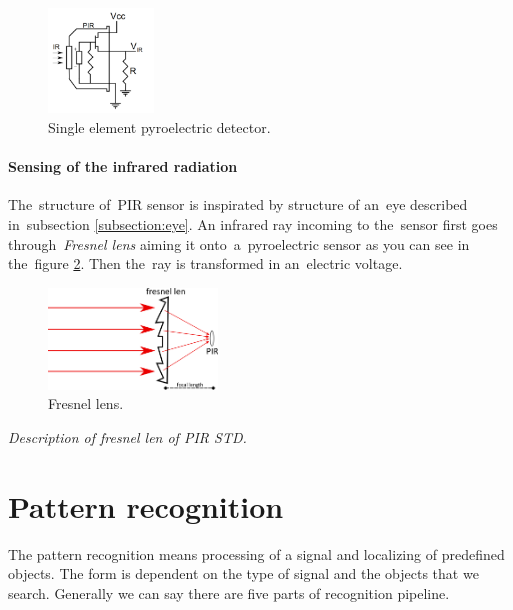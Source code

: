 \begin{figure}[h!]
\begin{center}
\includegraphics[width=0.25\textwidth]{obrazky-figures/pirscheme.png}
\caption{Single element pyroelectric detector.\cite{an2105}\label{fig:pir}}
\end{center}    
\end{figure}


\paragraph{Sensing of the infrared radiation}
The~structure of~PIR sensor is inspirated by structure of an~eye described in~subsection \ref{subsection:eye}.
An infrared ray incoming to the~sensor first goes through~{\it Fresnel lens} aiming it onto~a~pyroelectric sensor
as you can see in the~figure \ref{fig:fresnellens}. Then the~ray is transformed in an~electric voltage.

\begin{figure}[h!]
\begin{center}
\includegraphics[width=0.4\textwidth]{obrazky-figures/fresnellens.png}
\caption{Fresnel lens.\label{fig:fresnellens}}
\end{center}
\end{figure}

{\it Description of fresnel len of PIR STD.}



\newpage
\section{Pattern recognition}
The pattern recognition means processing of a signal and localizing of predefined objects.
The form is dependent on the type of signal and the objects that we search. Generally we can say
there are five parts of recognition pipeline.

